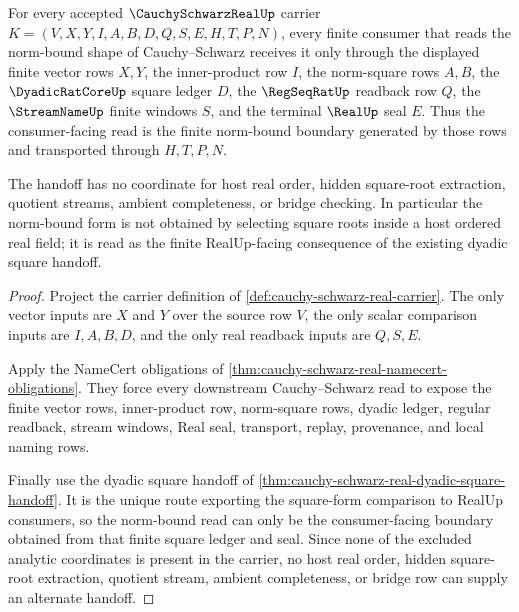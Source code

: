 \begin{theorem}
\label{thm:cauchy-schwarz-real-norm-bound}
For every accepted $\CauchySchwarzRealUp$ carrier $K=(V,X,Y,I,A,B,D,Q,S,E,H,T,P,N)$, every finite consumer that reads the norm-bound shape of Cauchy--Schwarz receives it only through the displayed finite vector rows $X,Y$, the inner-product row $I$, the norm-square rows $A,B$, the $\DyadicRatCoreUp$ square ledger $D$, the $\RegSeqRatUp$ readback row $Q$, the $\StreamNameUp$ finite windows $S$, and the terminal $\RealUp$ seal $E$. Thus the consumer-facing read is the finite norm-bound boundary generated by those rows and transported through $H,T,P,N$.

The handoff has no coordinate for host real order, hidden square-root extraction, quotient streams, ambient completeness, or bridge checking. In particular the norm-bound form is not obtained by selecting square roots inside a host ordered real field; it is read as the finite RealUp-facing consequence of the existing dyadic square handoff.
\end{theorem}
\begin{proof}
Project the carrier definition of \autoref{def:cauchy-schwarz-real-carrier}. The only vector inputs are $X$ and $Y$ over the source row $V$, the only scalar comparison inputs are $I,A,B,D$, and the only real readback inputs are $Q,S,E$.

Apply the NameCert obligations of \autoref{thm:cauchy-schwarz-real-namecert-obligations}. They force every downstream Cauchy--Schwarz read to expose the finite vector rows, inner-product row, norm-square rows, dyadic ledger, regular readback, stream windows, Real seal, transport, replay, provenance, and local naming rows.

Finally use the dyadic square handoff of \autoref{thm:cauchy-schwarz-real-dyadic-square-handoff}. It is the unique route exporting the square-form comparison to RealUp consumers, so the norm-bound read can only be the consumer-facing boundary obtained from that finite square ledger and seal. Since none of the excluded analytic coordinates is present in the carrier, no host real order, hidden square-root extraction, quotient stream, ambient completeness, or bridge row can supply an alternate handoff.
\end{proof}

